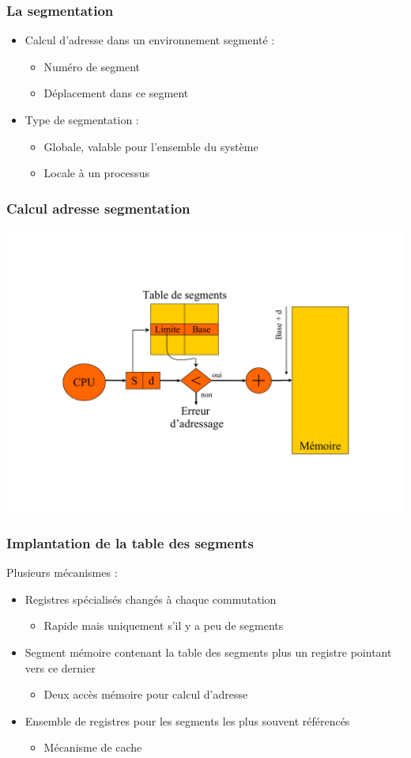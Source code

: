 \begin{frame}
\frametitle{La segmentation}
\begin{itemize}
\item Calcul d'adresse dans un environnement segmenté :
\begin{itemize}
\item Numéro de segment
\item Déplacement dans ce segment
\end{itemize}
\item Type de segmentation :
\begin{itemize}
\item Globale, valable pour l'ensemble du système
\item Locale à un processus
\end{itemize}
\end{itemize}
\end{frame}


\begin{frame}
\frametitle{Calcul adresse segmentation}
\includegraphics[width=.9\textwidth]{../illustration/memoire_segment_acces.pdf}
\end{frame}


\begin{frame}
\frametitle{Implantation de la table des segments }
Plusieurs mécanismes :
\begin{itemize}
\item Registres spécialisés changés à chaque commutation
\begin{itemize}
\item Rapide mais uniquement s'il y a peu de segments
\end{itemize}
\item Segment mémoire contenant la table des segments plus un registre pointant vers ce dernier
\begin{itemize}
\item Deux accès mémoire pour calcul d'adresse
\end{itemize}
\item Ensemble de registres pour les segments les plus souvent référencés
\begin{itemize}
\item Mécanisme de cache
\end{itemize}
\end{itemize}
\end{frame}

